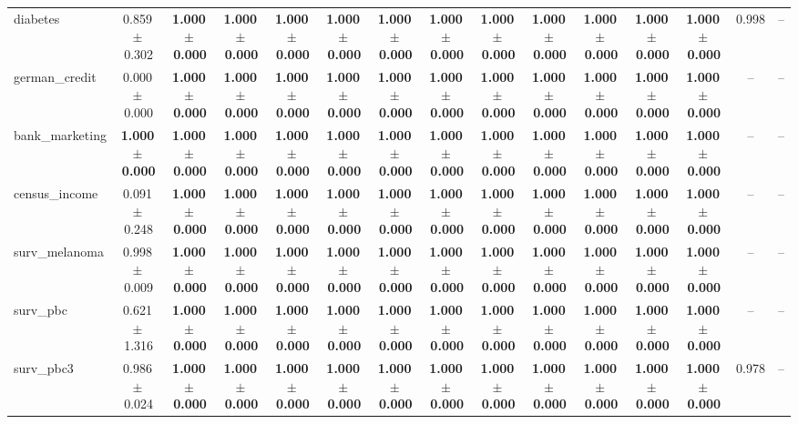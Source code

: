 \documentclass[8pt]{extarticle}
\begin{document}
\begin{longtable}{l*{14}{c}}
diabetes & 0.859\,$\pm$\,0.302 & \textbf{1.000\,$\pm$\,0.000} & \textbf{1.000\,$\pm$\,0.000} & \textbf{1.000\,$\pm$\,0.000} & \textbf{1.000\,$\pm$\,0.000} & \textbf{1.000\,$\pm$\,0.000} & \textbf{1.000\,$\pm$\,0.000} & \textbf{1.000\,$\pm$\,0.000} & \textbf{1.000\,$\pm$\,0.000} & \textbf{1.000\,$\pm$\,0.000} & \textbf{1.000\,$\pm$\,0.000} & \textbf{1.000\,$\pm$\,0.000} & 0.998 & -- \\
german\_credit & 0.000\,$\pm$\,0.000 & \textbf{1.000\,$\pm$\,0.000} & \textbf{1.000\,$\pm$\,0.000} & \textbf{1.000\,$\pm$\,0.000} & \textbf{1.000\,$\pm$\,0.000} & \textbf{1.000\,$\pm$\,0.000} & \textbf{1.000\,$\pm$\,0.000} & \textbf{1.000\,$\pm$\,0.000} & \textbf{1.000\,$\pm$\,0.000} & \textbf{1.000\,$\pm$\,0.000} & \textbf{1.000\,$\pm$\,0.000} & \textbf{1.000\,$\pm$\,0.000} & -- & -- \\
bank\_marketing & \textbf{1.000\,$\pm$\,0.000} & \textbf{1.000\,$\pm$\,0.000} & \textbf{1.000\,$\pm$\,0.000} & \textbf{1.000\,$\pm$\,0.000} & \textbf{1.000\,$\pm$\,0.000} & \textbf{1.000\,$\pm$\,0.000} & \textbf{1.000\,$\pm$\,0.000} & \textbf{1.000\,$\pm$\,0.000} & \textbf{1.000\,$\pm$\,0.000} & \textbf{1.000\,$\pm$\,0.000} & \textbf{1.000\,$\pm$\,0.000} & \textbf{1.000\,$\pm$\,0.000} & -- & -- \\
census\_income & 0.091\,$\pm$\,0.248 & \textbf{1.000\,$\pm$\,0.000} & \textbf{1.000\,$\pm$\,0.000} & \textbf{1.000\,$\pm$\,0.000} & \textbf{1.000\,$\pm$\,0.000} & \textbf{1.000\,$\pm$\,0.000} & \textbf{1.000\,$\pm$\,0.000} & \textbf{1.000\,$\pm$\,0.000} & \textbf{1.000\,$\pm$\,0.000} & \textbf{1.000\,$\pm$\,0.000} & \textbf{1.000\,$\pm$\,0.000} & \textbf{1.000\,$\pm$\,0.000} & -- & -- \\
surv\_melanoma & 0.998\,$\pm$\,0.009 & \textbf{1.000\,$\pm$\,0.000} & \textbf{1.000\,$\pm$\,0.000} & \textbf{1.000\,$\pm$\,0.000} & \textbf{1.000\,$\pm$\,0.000} & \textbf{1.000\,$\pm$\,0.000} & \textbf{1.000\,$\pm$\,0.000} & \textbf{1.000\,$\pm$\,0.000} & \textbf{1.000\,$\pm$\,0.000} & \textbf{1.000\,$\pm$\,0.000} & \textbf{1.000\,$\pm$\,0.000} & \textbf{1.000\,$\pm$\,0.000} & -- & -- \\
surv\_pbc & 0.621\,$\pm$\,1.316 & \textbf{1.000\,$\pm$\,0.000} & \textbf{1.000\,$\pm$\,0.000} & \textbf{1.000\,$\pm$\,0.000} & \textbf{1.000\,$\pm$\,0.000} & \textbf{1.000\,$\pm$\,0.000} & \textbf{1.000\,$\pm$\,0.000} & \textbf{1.000\,$\pm$\,0.000} & \textbf{1.000\,$\pm$\,0.000} & \textbf{1.000\,$\pm$\,0.000} & \textbf{1.000\,$\pm$\,0.000} & \textbf{1.000\,$\pm$\,0.000} & -- & -- \\
surv\_pbc3 & 0.986\,$\pm$\,0.024 & \textbf{1.000\,$\pm$\,0.000} & \textbf{1.000\,$\pm$\,0.000} & \textbf{1.000\,$\pm$\,0.000} & \textbf{1.000\,$\pm$\,0.000} & \textbf{1.000\,$\pm$\,0.000} & \textbf{1.000\,$\pm$\,0.000} & \textbf{1.000\,$\pm$\,0.000} & \textbf{1.000\,$\pm$\,0.000} & \textbf{1.000\,$\pm$\,0.000} & \textbf{1.000\,$\pm$\,0.000} & \textbf{1.000\,$\pm$\,0.000} & 0.978 & -- \\

\end{longtable}
\end{document}
